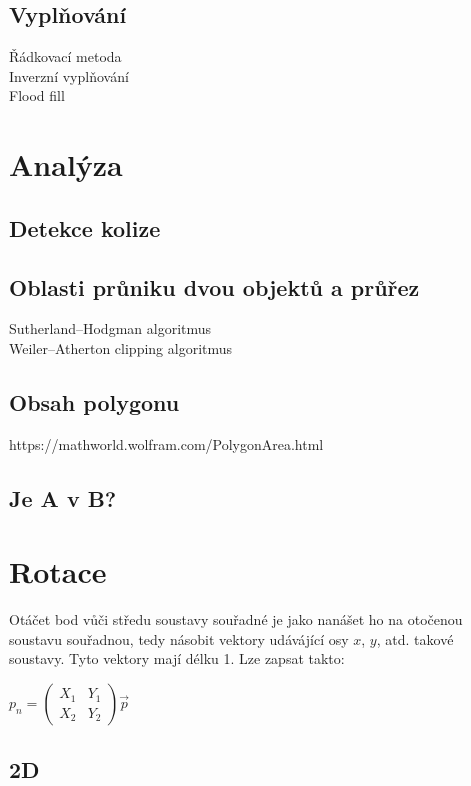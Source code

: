 \documentclass[a4paper,12pt]{book}
\begin{document}
\section{Vyplňování} %


Řádkovací metoda
\\Inverzní vyplňování
\\Flood fill


\chapter{Analýza}
\section{Detekce kolize}
\section{Oblasti průniku dvou objektů a průřez}
Sutherland–Hodgman algoritmus
\\Weiler–Atherton clipping algoritmus

\section{Obsah polygonu}
https://mathworld.wolfram.com/PolygonArea.html
\section{Je A v B?}




\chapter{Rotace}


Otáčet bod vůči středu soustavy souřadné je jako nanášet ho na otočenou soustavu souřadnou, tedy násobit vektory udávájící osy $x$, $y$, atd. takové soustavy.
Tyto vektory mají délku 1. Lze zapsat takto:

$p_n = \begin{pmatrix}
X_1 & Y_1 \\
X_2 & Y_2
\end{pmatrix}\vec{p}$\\


\section{2D}
\end{document}
